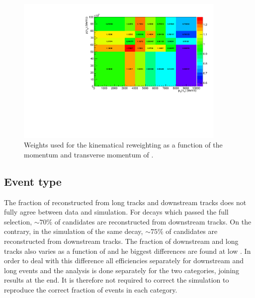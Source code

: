 \begin{figure}
\centering
\includegraphics[width=0.9\textwidth]{Lmumu/figs/ratio_Lb_p_pt.pdf}
 \caption{Weights used for the kinematical reweighting as a function of the momentum and transverse momentum of \Lb. }
\label{fig:kinWeight}
\end{figure}

\subsection{Event type}

The fraction of \Lz reconstructed from long tracks and downstream tracks does not fully agree between data and simulation.
For \Lb\to\jpsi\Lz decays which passed the full selection, $\sim 70\%$ of candidates are reconstructed from downstream tracks.
On the contrary, in the simulation of the same decay, $\sim 75\%$ of candidates are reconstructed from downstream tracks.
The fraction of downstream and long tracks also varies as a function of \qsq and he biggest differences are found at low \qsq.
In order to deal with this difference all efficiencies separately for downstream and long events and the analysis is done 
separately for the two categories, joining results at the end. It is therefore not required to correct the simulation
to reproduce the correct fraction of events in each category.

